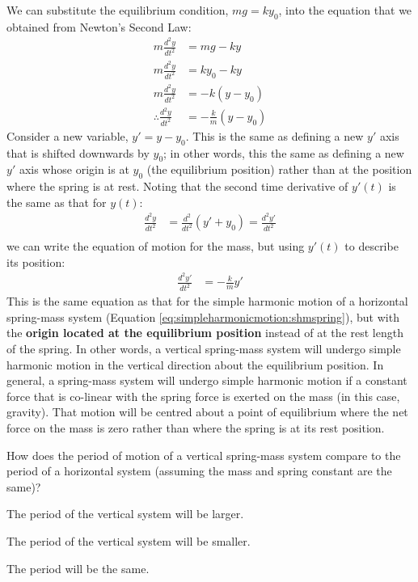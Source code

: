 We can substitute the equilibrium condition, $mg = ky_0$, into the equation that we obtained from Newton's Second Law:
\begin{align*}
 m \frac{d^2y}{dt^2}& = mg - ky \\
m \frac{d^2y}{dt^2}&= ky_0 - ky\\
m \frac{d^2y}{dt^2}&=-k(y-y_0) \\
\therefore \frac{d^2y}{dt^2} &= -\frac{k}{m}(y-y_0)
\end{align*}
Consider a new variable, $y'=y-y_0$. This is the same as defining a new $y'$ axis that is shifted downwards by $y_0$; in other words, this the same as defining a new $y'$ axis whose origin is at $y_0$ (the equilibrium position) rather than at the position where the spring is at rest. Noting that the second time derivative of $y'(t)$ is the same as that for $y(t)$:
\begin{align*}
\frac{d^2y}{dt^2} &= \frac{d^2}{dt^2} (y' + y_0) = \frac{d^2y'}{dt^2}\\
\end{align*}
we can write the equation of motion for the mass, but using $y'(t)$ to describe its position:
\begin{align*}
\frac{d^2y'}{dt^2} &= -\frac{k}{m}y'
\end{align*}
This is the same equation as that for the simple harmonic motion of a horizontal spring-mass system (Equation \ref{eq:simpleharmonicmotion:shmspring}), but with the \textbf{origin located at the equilibrium position} instead of at the rest length of the spring. In other words, a vertical spring-mass system will undergo simple harmonic motion in the vertical direction about the equilibrium position. In general, a spring-mass system will undergo simple harmonic motion if a constant force that is co-linear with the spring force is exerted on the mass (in this case, gravity). That motion will be centred about a point of equilibrium where the net force on the mass is zero rather than where the spring is at its rest position.

\begin{checkpoint}
\begin{MCquestion}
{How does the period of motion of a vertical spring-mass system compare to the period of a horizontal system (assuming the mass and spring constant are the same)?}
\item The period of the vertical system will be larger. 
\item The period of the vertical system will be smaller.
\item The period will be the same. \correct 
\end{MCquestion}
\end{checkpoint}

